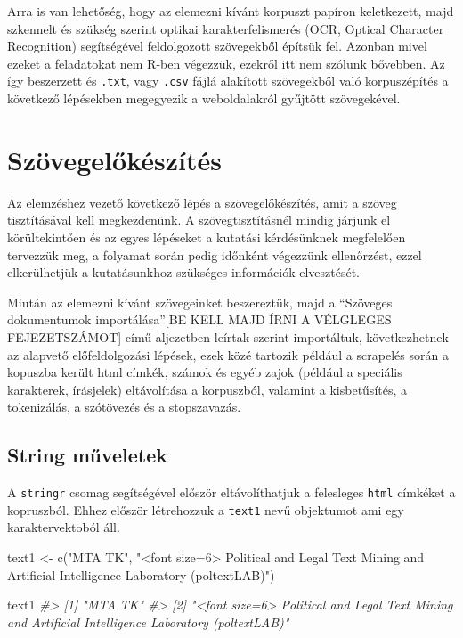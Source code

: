 \documentclass[
]{book}
\newenvironment{Shaded}{\begin{snugshade}}{\end{snugshade}}
\newcommand{\CommentTok}[1]{\textcolor[rgb]{0.56,0.35,0.01}{\textit{#1}}}
\newcommand{\FunctionTok}[1]{\textcolor[rgb]{0.00,0.00,0.00}{#1}}
\newcommand{\NormalTok}[1]{#1}
\newcommand{\OtherTok}[1]{\textcolor[rgb]{0.56,0.35,0.01}{#1}}
\newcommand{\StringTok}[1]{\textcolor[rgb]{0.31,0.60,0.02}{#1}}
\begin{document}
Arra is van lehetőség, hogy az elemezni kívánt korpuszt papíron
keletkezett, majd szkennelt és szükség szerint optikai
karakterfelismerés (OCR, Optical Character Recognition) segítségével
feldolgozott szövegekből építsük fel. Azonban mivel ezeket a feladatokat
nem R-ben végezzük, ezekről itt nem szólunk bővebben. Az így beszerzett
és \texttt{.txt}, vagy \texttt{.csv} fájlá alakított szövegekből való
korpuszépítés a következő lépésekben megegyezik a weboldalakról gyűjtött
szövegekével.

\hypertarget{szuxf6vegelux151kuxe9szuxedtuxe9s}{%
\section{Szövegelőkészítés}\label{szuxf6vegelux151kuxe9szuxedtuxe9s}}

Az elemzéshez vezető következő lépés a szövegelőkészítés, amit a szöveg
tisztításával kell megkezdenünk. A szövegtisztításnél mindig járjunk el
körültekintően és az egyes lépéseket a kutatási kérdésünknek megfelelően
tervezzük meg, a folyamat során pedig időnként végezzünk ellenőrzést,
ezzel elkerülhetjük a kutatásunkhoz szükséges információk elvesztését.

Miután az elemezni kívánt szövegeinket beszereztük, majd a ``Szöveges
dokumentumok importálása''{[}BE KELL MAJD ÍRNI A VÉLGLEGES
FEJEZETSZÁMOT{]} című aljezetben leírtak szerint importáltuk,
következhetnek az alapvető előfeldolgozási lépések, ezek közé tartozik
például a scrapelés során a kopuszba került html címkék, számok és egyéb
zajok (például a speciális karakterek, írásjelek) eltávolítása a
korpuszból, valamint a kisbetűsítés, a tokenizálás, a szótövezés és a
stopszavazás.

\hypertarget{string-mux171veletek}{%
\subsection{String műveletek}\label{string-mux171veletek}}

A \texttt{stringr} csomag segítségével először eltávolíthatjuk a
felesleges \texttt{html} címkéket a kopruszból. Ehhez először
létrehozzuk a \texttt{text1} nevű objektumot ami egy karaktervektoból
áll.

\begin{Shaded}
\begin{Highlighting}[]

\NormalTok{text1 }\OtherTok{\textless{}{-}} \FunctionTok{c}\NormalTok{(}\StringTok{"MTA TK"}\NormalTok{, }\StringTok{"\textless{}font size=\textquotesingle{}6\textquotesingle{}\textgreater{} Political and Legal Text Mining and Artificial Intelligence Laboratory (poltextLAB)"}\NormalTok{)}

\NormalTok{text1}
\CommentTok{\#\textgreater{} [1] "MTA TK"                                                                                             }
\CommentTok{\#\textgreater{} [2] "\textless{}font size=\textquotesingle{}6\textquotesingle{}\textgreater{} Political and Legal Text Mining and Artificial Intelligence Laboratory (poltextLAB)"}
\end{Highlighting}
\end{Shaded}
\end{document}
